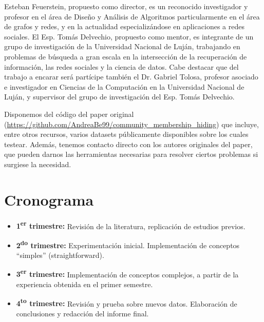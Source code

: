 \documentclass[11pt,a4paper]{article}
\begin{document}
Esteban Feuerstein, propuesto como director, es un reconocido investigador y profesor en el área de Diseño y Análisis de Algoritmos
particularmente en el área de grafos y redes, y en la actualidad especializándose en aplicaciones a redes sociales. El Esp. Tomás Delvechio, propuesto como mentor, es integrante de un grupo de investigación de la Universidad Nacional de Luján, trabajando en problemas de búsqueda a gran escala en la intersección de la recuperación de información, las redes sociales y la ciencia de datos.
Cabe destacar que del trabajo a encarar será partícipe también el Dr. Gabriel Tolosa, profesor asociado e investigador en Ciencias de la Computación en la Universidad Nacional de Luján, y supervisor del grupo de investigación del Esp. Tomás Delvechio.

Disponemos del código del paper original (\url{https://github.com/AndreaBe99/community_membership_hiding}) que incluye, entre otros recursos,
varios datasets públicamente disponibles sobre los cuales testear. Además, tenemos contacto directo con los autores originales del paper,
que pueden darnos las herramientas necesarias para resolver ciertos problemas si surgiese la necesidad.

\section*{Cronograma}
\begin{itemize}[leftmargin=*, label=\textbullet, itemsep=0.5ex]
    \item \textbf{1\textsuperscript{er} trimestre:} Revisión de la literatura, replicación de estudios previos.
    \item \textbf{2\textsuperscript{do} trimestre:} Experimentación inicial. Implementación de conceptos ``simples'' (straightforward).
    \item \textbf{3\textsuperscript{er} trimestre:} Implementación de conceptos complejos, a partir de la experiencia obtenida en el primer semestre.
    \item \textbf{4\textsuperscript{to} trimestre:} Revisión y prueba sobre nuevos datos. Elaboración de conclusiones y redacción del informe final.
\end{itemize}


\begingroup
\tiny
\nocite{*} %
\printbibliography[title={Referencias}]
\endgroup
\end{document}
